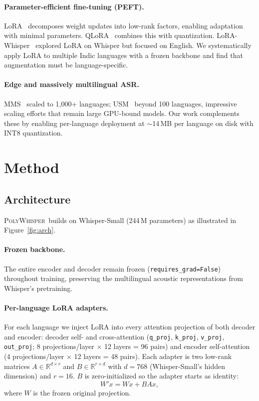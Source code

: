\documentclass[11pt,a4paper]{article}
\newcommand{\poly}{\textsc{PolyWhisper}}
\begin{document}
\paragraph{Parameter-efficient fine-tuning (PEFT).}
LoRA~\cite{hu2022lora} decomposes weight updates into low-rank factors, enabling adaptation with minimal parameters.
QLoRA~\cite{dettmers2023qlora} combines this with quantization.
LoRA-Whisper~\cite{song2024lorawhisper} explored LoRA on Whisper but focused on English.
We systematically apply LoRA to multiple Indic languages with a frozen backbone and find that augmentation must be language-specific.

\paragraph{Edge and massively multilingual ASR.}
MMS~\cite{pratap2024mms} scaled to 1,000+ languages; USM~\cite{zhang2023usm} beyond 100 languages, impressive scaling efforts that remain large GPU-bound models.
Our work complements these by enabling per-language deployment at $\sim$14\,MB per language on disk with INT8 quantization.

\section{Method}

\subsection{Architecture}

\poly\ builds on Whisper-Small (244\,M parameters) as illustrated in Figure~\ref{fig:arch}.

\paragraph{Frozen backbone.}
The entire encoder and decoder remain frozen (\texttt{requires\_grad=False}) throughout training, preserving the multilingual acoustic representations from Whisper's pretraining.

\paragraph{Per-language LoRA adapters.}
For each language we inject LoRA into every attention projection of both decoder and encoder:
decoder self- and cross-attention (\texttt{q\_proj}, \texttt{k\_proj}, \texttt{v\_proj}, \texttt{out\_proj}; 8 projections/layer $\times$ 12 layers = 96 pairs) and encoder self-attention (4 projections/layer $\times$ 12 layers = 48 pairs).
Each adapter is two low-rank matrices $A\in\mathbb{R}^{d\times r}$ and $B\in\mathbb{R}^{r\times d}$ with $d{=}768$ (Whisper-Small's hidden dimension) and $r{=}16$.
$B$ is zero-initialized so the adapter starts as identity:
\begin{equation}
  W'x = Wx + BAx,
\end{equation}
where $W$ is the frozen original projection.
\end{document}
